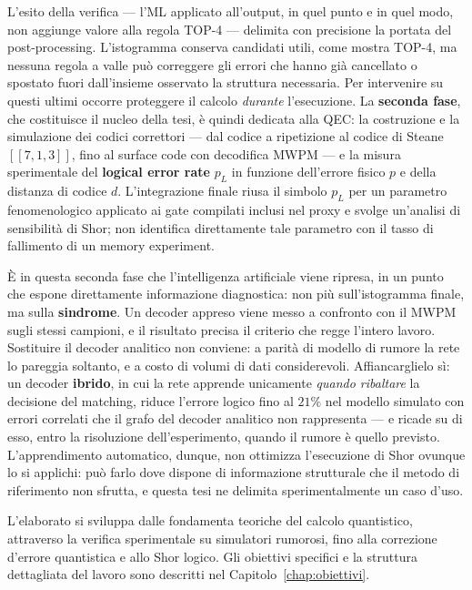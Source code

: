 \begin{onehalfspace}
L'esito della verifica --- l'\ac{ML} applicato all'output, in quel punto e in quel modo, non aggiunge valore alla regola TOP-4 --- delimita con precisione la portata del post-processing. L'istogramma conserva candidati utili, come mostra TOP-4, ma nessuna regola a valle può correggere gli errori che hanno già cancellato o spostato fuori dall'insieme osservato la struttura necessaria. Per intervenire su questi ultimi occorre proteggere il calcolo \emph{durante} l'esecuzione. La \textbf{seconda fase}, che costituisce il nucleo della tesi, è quindi dedicata alla \ac{QEC}: la costruzione e la simulazione dei codici correttori --- dal codice a ripetizione al codice di Steane $[[7,1,3]]$, fino al surface code con decodifica \ac{MWPM} --- e la misura sperimentale del \textbf{logical error rate} $p_L$ in funzione dell'errore fisico $p$ e della distanza di codice $d$. L'integrazione finale riusa il simbolo $p_L$ per un parametro fenomenologico applicato ai gate compilati inclusi nel proxy e svolge un'analisi di sensibilità di Shor; non identifica direttamente tale parametro con il tasso di fallimento di un memory experiment.

È in questa seconda fase che l'intelligenza artificiale viene ripresa, in un punto che espone direttamente informazione diagnostica: non più sull'istogramma finale, ma sulla \textbf{sindrome}. Un decoder appreso viene messo a confronto con il \ac{MWPM} sugli stessi campioni, e il risultato precisa il criterio che regge l'intero lavoro. Sostituire il decoder analitico non conviene: a parità di modello di rumore la rete lo pareggia soltanto, e a costo di volumi di dati considerevoli. Affiancarglielo sì: un decoder \textbf{ibrido}, in cui la rete apprende unicamente \emph{quando ribaltare} la decisione del matching, riduce l'errore logico fino al $21\%$ nel modello simulato con errori correlati che il grafo del decoder analitico non rappresenta --- e ricade su di esso, entro la risoluzione dell'esperimento, quando il rumore è quello previsto. L'apprendimento automatico, dunque, non ottimizza l'esecuzione di Shor ovunque lo si applichi: può farlo dove dispone di informazione strutturale che il metodo di riferimento non sfrutta, e questa tesi ne delimita sperimentalmente un caso d'uso.

L'elaborato si sviluppa dalle fondamenta teoriche del calcolo quantistico, attraverso la verifica sperimentale su simulatori rumorosi, fino alla correzione d'errore quantistica e allo Shor logico. Gli obiettivi specifici e la struttura dettagliata del lavoro sono descritti nel Capitolo~\ref{chap:obiettivi}.


\end{onehalfspace}
